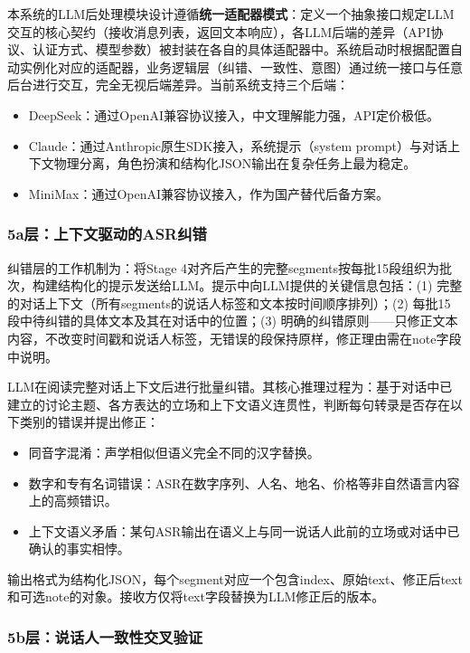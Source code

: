 \documentclass[12pt, a4paper]{article}
\begin{document}
本系统的LLM后处理模块设计遵循\textbf{统一适配器模式}：定义一个抽象接口规定LLM交互的核心契约（接收消息列表，返回文本响应），各LLM后端的差异（API协议、认证方式、模型参数）被封装在各自的具体适配器中。系统启动时根据配置自动实例化对应的适配器，业务逻辑层（纠错、一致性、意图）通过统一接口与任意后台进行交互，完全无视后端差异。当前系统支持三个后端：
\begin{itemize}
    \item DeepSeek：通过OpenAI兼容协议接入，中文理解能力强，API定价极低。
    \item Claude：通过Anthropic原生SDK接入，系统提示（system prompt）与对话上下文物理分离，角色扮演和结构化JSON输出在复杂任务上最为稳定。
    \item MiniMax：通过OpenAI兼容协议接入，作为国产替代后备方案。
\end{itemize}

\subsubsection{5a层：上下文驱动的ASR纠错}

纠错层的工作机制为：将Stage 4对齐后产生的完整segments按每批15段组织为批次，构建结构化的提示发送给LLM。提示中向LLM提供的关键信息包括：(1) 完整的对话上下文（所有segments的说话人标签和文本按时间顺序排列）；(2) 每批15段中待纠错的具体文本及其在对话中的位置；(3) 明确的纠错原则——只修正文本内容，不改变时间戳和说话人标签，无错误的段保持原样，修正理由需在note字段中说明。

LLM在阅读完整对话上下文后进行批量纠错。其核心推理过程为：基于对话中已建立的讨论主题、各方表达的立场和上下文语义连贯性，判断每句转录是否存在以下类别的错误并提出修正：
\begin{itemize}
    \item 同音字混淆：声学相似但语义完全不同的汉字替换。
    \item 数字和专有名词错误：ASR在数字序列、人名、地名、价格等非自然语言内容上的高频错识。
    \item 上下文语义矛盾：某句ASR输出在语义上与同一说话人此前的立场或对话中已确认的事实相悖。
\end{itemize}

输出格式为结构化JSON，每个segment对应一个包含index、原始text、修正后text和可选note的对象。接收方仅将text字段替换为LLM修正后的版本。

\subsubsection{5b层：说话人一致性交叉验证}
\end{document}
